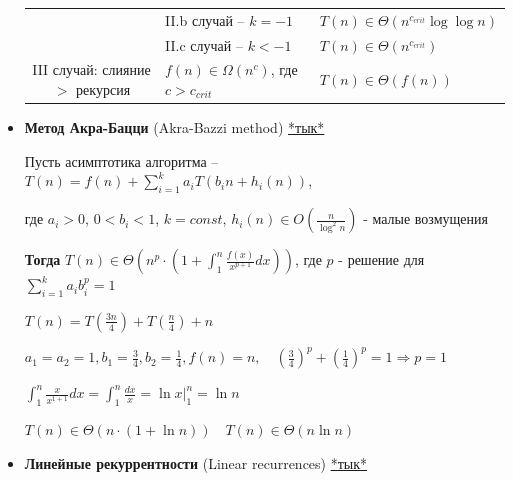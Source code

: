 \documentclass[12pt]{article}
\begin{document}
\begin{itemize}
\begin{tabular}{cll}
            & II.b случай -- $k = -1$ & $T(n) \in \Theta(n^{c_{crit}} \log \log n)$ \\

            & II.c случай -- $k < -1$ & $T(n) \in \Theta(n^{c_{crit}})$ \\

            \hline

            III случай: слияние $>$ рекурсия & $f(n) \in \Omega(n^c)$, где $c > c_{crit}$ & $T(n) \in \Theta(f(n))$\\

            \hline

        \end{tabular}

        \vspace{4mm}

        \item \textbf{Метод Акра-Бацци} (Akra-Bazzi method)
        \hfill\href{https://en.wikipedia.org/wiki/Akra%E2%80%93Bazzi_method}{*тык*}


        Пусть асимптотика алгоритма -- $T(n) = f(n) + \sum_{i = 1}^k a_i T(b_i n + h_i(n))$,

        где $a_i > 0$, $0 < b_i < 1$, $k = const$, $h_i(n) \in O\left(\frac{n}{\log^2 n}\right)$ - малые возмущения

        \textbf{Тогда} $T(n) \in \Theta\left(n^p \cdot \left(1 + \int_1^n \frac{f(x)}{x^{p + 1}} dx\right)\right)$, где $p$ - решение для $\sum_{i = 1}^k a_i b_i^p = 1$

        \Exs $T(n) = T\left(\frac{3n}{4}\right) + T\left(\frac{n}{4}\right) + n$

        $a_1 = a_2 = 1, b_1 = \frac{3}{4}, b_2 = \frac{1}{4}, f(n) = n, \quad \left(\frac{3}{4}\right)^p + \left(\frac{1}{4}\right)^p = 1 \Longrightarrow p = 1$

        $\int_1^n \frac{x}{x^{1 + 1}}dx = \int_1^n \frac{dx}{x} = \ln x \Big|_1^n = \ln n$

        $T(n) \in \Theta(n \cdot (1 + \ln n)) \quad T(n) \in \Theta(n \ln n)$

        \vspace{3mm}

        \item \textbf{Линейные рекуррентности} (Linear recurrences)
        \hfill\href{https://ru.wikipedia.org/wiki/%D0%A0%D0%B5%D0%BA%D1%83%D1%80%D1%80%D0%B5%D0%BD%D1%82%D0%BD%D0%B0%D1%8F_%D1%84%D0%BE%D1%80%D0%BC%D1%83%D0%BB%D0%B0#%D0%9B%D0%B8%D0%BD%D0%B5%D0%B9%D0%BD%D1%8B%D0%B5_%D1%80%D0%B5%D0%BA%D1%83%D1%80%D1%80%D0%B5%D0%BD%D1%82%D0%BD%D1%8B%D0%B5_%D1%83%D1%80%D0%B0%D0%B2%D0%BD%D0%B5%D0%BD%D0%B8%D1%8F}{*тык*}


\end{itemize}
\end{document}
